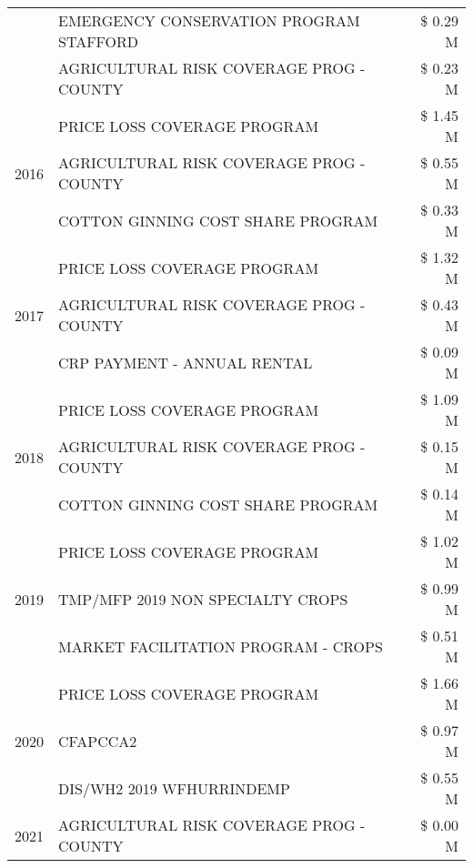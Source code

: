 \begin{tabular}{llr}
 & EMERGENCY CONSERVATION PROGRAM STAFFORD & \$ 0.29 M \\
 & AGRICULTURAL RISK COVERAGE PROG - COUNTY & \$ 0.23 M \\
\cline{1-3}
\multirow[t]{3}{*}{2016} & PRICE LOSS COVERAGE PROGRAM & \$ 1.45 M \\
 & AGRICULTURAL RISK COVERAGE PROG - COUNTY & \$ 0.55 M \\
 & COTTON GINNING COST SHARE PROGRAM & \$ 0.33 M \\
\cline{1-3}
\multirow[t]{3}{*}{2017} & PRICE LOSS COVERAGE PROGRAM & \$ 1.32 M \\
 & AGRICULTURAL RISK COVERAGE PROG - COUNTY & \$ 0.43 M \\
 & CRP PAYMENT - ANNUAL RENTAL & \$ 0.09 M \\
\cline{1-3}
\multirow[t]{3}{*}{2018} & PRICE LOSS COVERAGE PROGRAM & \$ 1.09 M \\
 & AGRICULTURAL RISK COVERAGE PROG - COUNTY & \$ 0.15 M \\
 & COTTON GINNING COST SHARE PROGRAM & \$ 0.14 M \\
\cline{1-3}
\multirow[t]{3}{*}{2019} & PRICE LOSS COVERAGE PROGRAM & \$ 1.02 M \\
 & TMP/MFP 2019 NON SPECIALTY CROPS & \$ 0.99 M \\
 & MARKET FACILITATION PROGRAM - CROPS & \$ 0.51 M \\
\cline{1-3}
\multirow[t]{3}{*}{2020} & PRICE LOSS COVERAGE PROGRAM & \$ 1.66 M \\
 & CFAPCCA2 & \$ 0.97 M \\
 & DIS/WH2 2019 WFHURRINDEMP & \$ 0.55 M \\
\cline{1-3}
2021 & AGRICULTURAL RISK COVERAGE PROG - COUNTY & \$ 0.00 M \\
\cline{1-3}
\bottomrule
\end{tabular}
